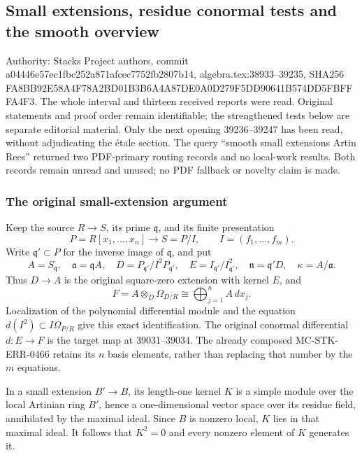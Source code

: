 \subsection{Small extensions, residue conormal tests and the smooth overview}\label{algebra-proof-050-small-extensions-residue-conormal-tests-and-the-smooth-overview}

Authority: Stacks Project authors, commit a04446e57ec1fbc252a871afcec7752fb2807b14, algebra.tex:38933--39235, SHA256 FA8BB92E58A4F78A2BD01B3B6A4A87DE0A0D279F5DD90641B574DD5FBFFFA4F3. The whole interval and thirteen received reports were read. Original statements and proof order remain identifiable; the strengthened tests below are separate editorial material. Only the next opening 39236--39247 has been read, without adjudicating the étale section. The query ``smooth small extensions Artin Rees'' returned two PDF-primary routing records and no local-work results. Both records remain unread and unused; no PDF fallback or novelty claim is made.

\subsubsection{The original small-extension argument}\label{algebra-proof-050-the-original-small-extension-argument}

Keep the source \(R\to S\), its prime \(\mathfrak q\), and its finite presentation \[
P=R[x_1,\ldots,x_n]\longrightarrow S=P/I,\qquad
I=(f_1,\ldots,f_m).
\] Write \(\mathfrak q'\subset P\) for the inverse image of \(\mathfrak q\), and put \[
A=S_{\mathfrak q},\quad \mathfrak a=\mathfrak q A,\quad
D=P_{\mathfrak q'}/I^2P_{\mathfrak q'},\quad
E=I_{\mathfrak q'}/I_{\mathfrak q'}^2,\quad
\mathfrak n=\mathfrak q'D,\quad \kappa=A/\mathfrak a.
\] Thus \(D\to A\) is the original square-zero extension with kernel \(E\), and \[
F=A\otimes_D\Omega_{D/R}\cong
\bigoplus_{j=1}^n A\,dx_j.
\] Localization of the polynomial differential module and the equation \(d(I^2)\subset I\Omega_{P/R}\) give this exact identification. The original conormal differential \(d:E\to F\) is the target map at 39031--39034. The already composed MC-STK-ERR-0466 retains its \(n\) basis elements, rather than replacing that number by the \(m\) equations.

In a small extension \(B'\to B\), its length-one kernel \(K\) is a simple module over the local Artinian ring \(B'\), hence a one-dimensional vector space over its residue field, annihilated by the maximal ideal. Since \(B\) is nonzero local, \(K\) lies in that maximal ideal. It follows that \(K^2=0\) and every nonzero element of \(K\) generates it.

